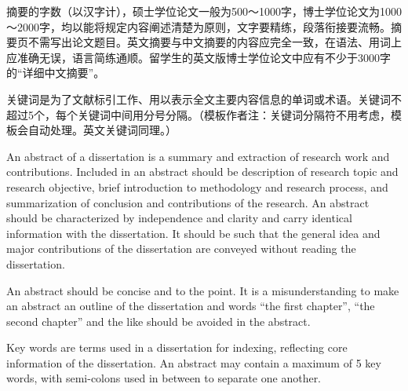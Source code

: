 
\begin{abstract-zh}

摘要的字数（以汉字计），硕士学位论文一般为500～1000字，博士学位论文为1000～2000字，均以能将规定内容阐述清楚为原则，文字要精练，段落衔接要流畅。摘要页不需写出论文题目。英文摘要与中文摘要的内容应完全一致，在语法、用词上应准确无误，语言简练通顺。留学生的英文版博士学位论文中应有不少于3000字的“详细中文摘要”。

关键词是为了文献标引工作、用以表示全文主要内容信息的单词或术语。关键词不超过5个，每个关键词中间用分号分隔。（模板作者注：关键词分隔符不用考虑，模板会自动处理。英文关键词同理。）

\end{abstract-zh}

\begin{abstract-en}
   An abstract of a dissertation is a summary and extraction of research work
   and contributions. Included in an abstract should be description of research
   topic and research objective, brief introduction to methodology and research
   process, and summarization of conclusion and contributions of the
   research. An abstract should be characterized by independence and clarity and
   carry identical information with the dissertation. It should be such that the
   general idea and major contributions of the dissertation are conveyed without
   reading the dissertation.

   An abstract should be concise and to the point. It is a misunderstanding to
   make an abstract an outline of the dissertation and words ``the first
   chapter'', ``the second chapter'' and the like should be avoided in the
   abstract.

   Key words are terms used in a dissertation for indexing, reflecting core
   information of the dissertation. An abstract may contain a maximum of 5 key
   words, with semi-colons used in between to separate one another.
\end{abstract-en}
